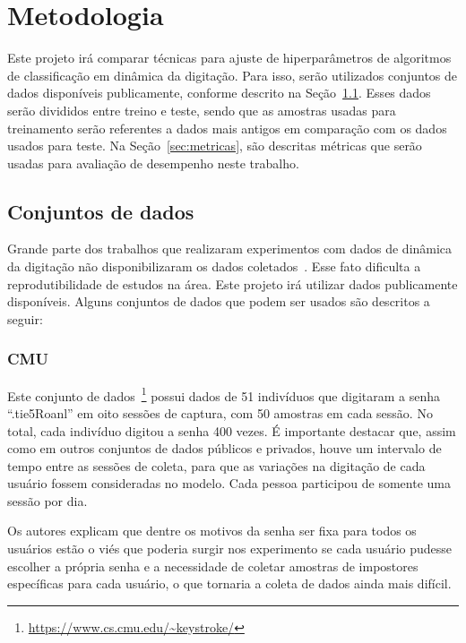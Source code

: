 \section{Metodologia}\label{sec:metodologia}

Este projeto irá comparar técnicas para ajuste de hiperparâmetros de algoritmos de classificação em dinâmica da digitação. Para isso, serão utilizados conjuntos de dados disponíveis publicamente, conforme descrito na Seção~\ref{subsec:datasets}. Esses dados serão divididos entre treino e teste, sendo que as amostras usadas para treinamento serão referentes a dados mais antigos em comparação com os dados usados para teste. Na Seção~\ref{sec:metricas}, são descritas métricas que serão usadas para avaliação de desempenho neste trabalho.


\subsection{Conjuntos de dados}\label{subsec:datasets}

Grande parte dos trabalhos que realizaram experimentos com dados de dinâmica da digitação não disponibilizaram os dados coletados~\cite{Roy2022systematic}. Esse fato dificulta a reprodutibilidade de estudos na área. Este projeto irá utilizar dados publicamente disponíveis. Alguns conjuntos de dados que podem ser usados são descritos a seguir:


\subsubsection{CMU}\label{subsubsec:cmu}

Este conjunto de dados~\footnote{\url{https://www.cs.cmu.edu/~keystroke/}} possui dados de 51 indivíduos que digitaram a senha ``.tie5Roanl'' em oito sessões de captura, com 50 amostras em cada sessão. No total, cada indivíduo digitou a senha 400 vezes. É importante destacar que, assim como em outros conjuntos de dados públicos e privados, houve um intervalo de tempo entre as sessões de coleta, para que as variações na digitação de cada usuário fossem consideradas no modelo. Cada pessoa participou de somente uma sessão por dia.

Os autores explicam que dentre os motivos da senha ser fixa para todos os usuários estão o viés que poderia surgir nos experimento se cada usuário pudesse escolher a própria senha e a necessidade de coletar amostras de impostores específicas para cada usuário, o que tornaria a coleta de dados ainda mais difícil.


